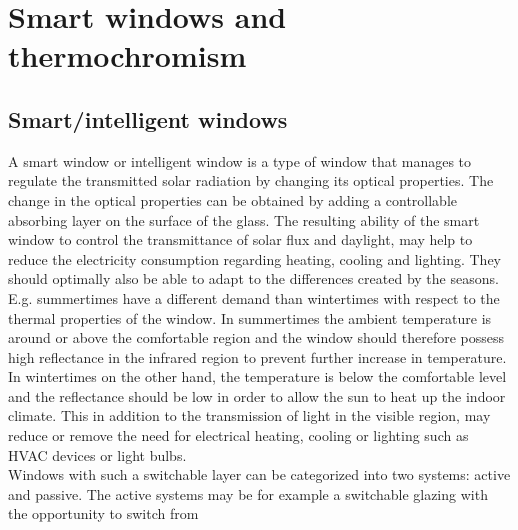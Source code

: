 \section{\textbf{Smart windows and thermochromism}}
\subsection{Smart/intelligent windows}
A smart window or intelligent window is a type of window that manages to 
regulate the transmitted solar radiation by changing its optical properties.
The change in the optical properties can be
obtained by adding a controllable absorbing layer on the surface of the glass. 
The resulting ability of the smart window to 
control the transmittance of%
solar flux and daylight, may help to
reduce the electricity consumption regarding heating, cooling and lighting.
They should optimally also be able to adapt to the differences created by the seasons. E.g. summertimes
have a different demand than wintertimes with respect to the thermal properties of the window. In
summertimes the ambient temperature is around or above the comfortable region and the window should
therefore possess high reflectance in the infrared region to prevent further increase in temperature. 
In wintertimes on the other hand, the temperature is below the comfortable level and the reflectance 
should be low in order to allow the sun to heat up the indoor climate. This in addition to the
transmission of light in the visible region, may reduce or remove the need for electrical heating, cooling
or lighting such as HVAC devices or light bulbs.
\cite{Dussault2012,Jelle2010,White1999} 
\\
Windows with such a
switchable layer can be categorized into two systems: active and passive. 
The active systems may be for example a switchable glazing with the opportunity to switch from 
